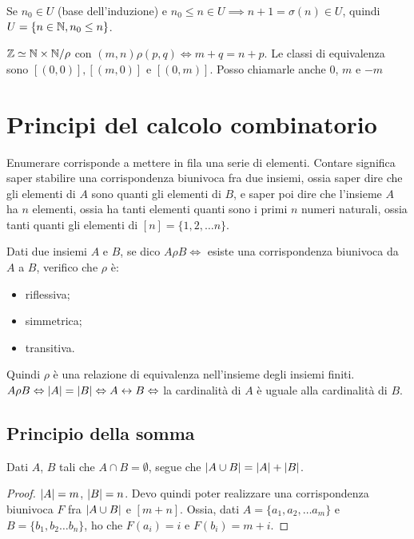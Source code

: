 Se $n_0 \in U$ (base dell'induzione) e $n_0 \le n \in U \implies n+1 = \sigma(n) \in U$, quindi $U = \{ n \in \mathbb{N}, n_0  \le n\}$.

$\mathbb{Z} \simeq \mathbb{N} \times \mathbb{N} / \rho$ con $(m, n) \rho (p, q) \iff m + q = n + p$. Le classi di equivalenza sono $[(0,0)], [(m,0)]$ e $[(0,m)]$. Posso chiamarle anche 0, $m$ e $-m$

\section{Principi del calcolo combinatorio}

Enumerare corrisponde a mettere in fila una serie di elementi. Contare significa saper stabilire una corrispondenza biunivoca fra due insiemi, ossia saper dire che gli elementi di $A$ sono quanti gli elementi di $B$, e saper poi dire che l'insieme $A$ ha $n$ elementi, ossia ha tanti elementi quanti sono i primi $n$ numeri naturali, ossia tanti quanti gli elementi di $[n] = \{1, 2, \dots n \}$.

Dati due insiemi $A$ e $B$, se dico $A \rho B \iff $ esiste una corrispondenza biunivoca da $A$ a $B$, verifico che $\rho$ \`e:
\begin{itemize}
   \item riflessiva;
   \item simmetrica;
   \item transitiva.
 \end{itemize} 
 Quindi $\rho$ \`e una relazione di equivalenza nell'insieme degli insiemi finiti. $A \rho B \Leftrightarrow \left\lvert{A}\right\rvert = \left\lvert{B}\right\rvert \Leftrightarrow A \leftrightarrow B \Leftrightarrow$ la cardinalit\`a di $A$ \`e uguale alla cardinalit\`a di $B$.

\subsection{Principio della somma}

\begin{prop}
 Dati $A$, $B$ tali che $A \cap B = \emptyset$, segue che $\left\lvert{A \cup B}\right\rvert = \left\lvert{A}\right\rvert + \left\lvert{B}\right\rvert$.
\end{prop}
\begin{proof}
$\left\lvert{A}\right\rvert = m$, $\left\lvert{B}\right\rvert = n$. Devo quindi poter realizzare una corrispondenza biunivoca $F$ fra $\left\lvert{A \cup B}\right\rvert$ e $[m + n]$. Ossia, dati $A = \{ a_1, a_2, \dots a_m\}$ e $B = \{ b_1, b_2 \dots b_n\}$, ho che $F(a_i) = i$ e $F(b_i) = m + i$.
\end{proof}


